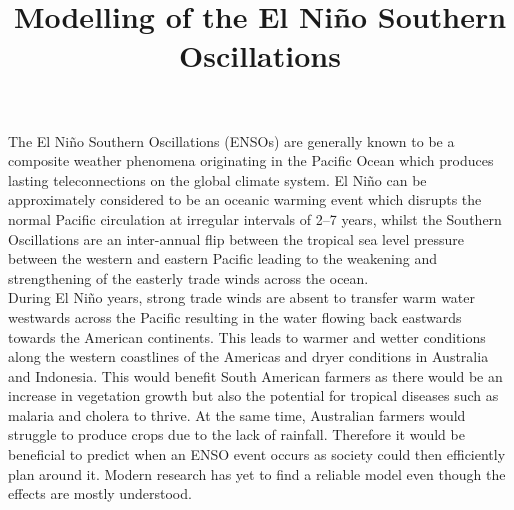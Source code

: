 \documentclass[12pt, onecolumn]{revtex4}    %
\begin{document}
                     

\title{Modelling of the El Ni\~{n}o Southern Oscillations} 

\maketitle
\thispagestyle{plain} %

The El Ni\~{n}o Southern Oscillations (ENSOs) are generally known to be a composite weather phenomena originating in the Pacific Ocean which produces lasting teleconnections on the global climate system. El Ni\~{n}o can be approximately considered to be an oceanic warming event which disrupts the normal Pacific circulation at irregular intervals of 2--7 years, whilst the Southern Oscillations are an inter-annual flip between the tropical sea level pressure between the western and eastern Pacific leading to the weakening and strengthening of the easterly trade winds across the ocean. \\

During El Ni\~{n}o years, strong trade winds are absent to transfer warm water westwards across the Pacific resulting in the water flowing back eastwards towards the American continents. This leads to warmer and wetter conditions along the western coastlines of the Americas and dryer conditions in Australia and Indonesia. This would benefit South American farmers as there would be an increase in vegetation growth but also the potential for tropical diseases such as malaria and cholera to thrive. At the same time, Australian farmers would struggle to produce crops due to the lack of rainfall. Therefore it would be beneficial to predict when an ENSO event occurs as society could then efficiently plan around it. Modern research has yet to find a reliable model even though the effects are mostly understood. \\

\end{document}
